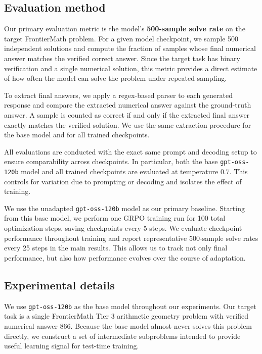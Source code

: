 \documentclass{article}
\begin{document}
\subsection{Evaluation method}
\label{sec:eval}

Our primary evaluation metric is the model's \textbf{500-sample solve rate} on the target FrontierMath problem. For a given model checkpoint, we sample 500 independent solutions and compute the fraction of samples whose final numerical answer matches the verified correct answer. Since the target task has binary verification and a single numerical solution, this metric provides a direct estimate of how often the model can solve the problem under repeated sampling.

To extract final answers, we apply a regex-based parser to each generated response and compare the extracted numerical answer against the ground-truth answer. A sample is counted as correct if and only if the extracted final answer exactly matches the verified solution. We use the same extraction procedure for the base model and for all trained checkpoints.

All evaluations are conducted with the exact same prompt and decoding setup to ensure comparability across checkpoints. In particular, both the base \texttt{gpt-oss-120b} model and all trained checkpoints are evaluated at temperature $0.7$. This controls for variation due to prompting or decoding and isolates the effect of training.

We use the unadapted \texttt{gpt-oss-120b} model as our primary baseline. Starting from this base model, we perform one GRPO training run for 100 total optimization steps, saving checkpoints every 5 steps. We evaluate checkpoint performance throughout training and report representative 500-sample solve rates every 25 steps in the main results. This allows us to track not only final performance, but also how performance evolves over the course of adaptation.

\subsection{Experimental details}

We use \texttt{gpt-oss-120b} as the base model throughout our experiments. Our target task is a single FrontierMath Tier 3 arithmetic geometry problem with verified numerical answer 866. Because the base model almost never solves this problem directly, we construct a set of intermediate subproblems intended to provide useful learning signal for test-time training.
\end{document}
